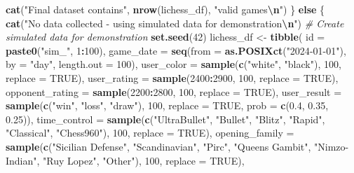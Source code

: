 \documentclass[
]{article}
\newenvironment{Shaded}{\begin{snugshade}}{\end{snugshade}}
\newcommand{\AttributeTok}[1]{\textcolor[rgb]{0.13,0.29,0.53}{#1}}
\newcommand{\CommentTok}[1]{\textcolor[rgb]{0.56,0.35,0.01}{\textit{#1}}}
\newcommand{\ConstantTok}[1]{\textcolor[rgb]{0.56,0.35,0.01}{#1}}
\newcommand{\ControlFlowTok}[1]{\textcolor[rgb]{0.13,0.29,0.53}{\textbf{#1}}}
\newcommand{\DecValTok}[1]{\textcolor[rgb]{0.00,0.00,0.81}{#1}}
\newcommand{\FloatTok}[1]{\textcolor[rgb]{0.00,0.00,0.81}{#1}}
\newcommand{\FunctionTok}[1]{\textcolor[rgb]{0.13,0.29,0.53}{\textbf{#1}}}
\newcommand{\NormalTok}[1]{#1}
\newcommand{\OtherTok}[1]{\textcolor[rgb]{0.56,0.35,0.01}{#1}}
\newcommand{\SpecialCharTok}[1]{\textcolor[rgb]{0.81,0.36,0.00}{\textbf{#1}}}
\newcommand{\StringTok}[1]{\textcolor[rgb]{0.31,0.60,0.02}{#1}}
\begin{document}
\begin{Shaded}
\begin{Highlighting}[]
  \FunctionTok{cat}\NormalTok{(}\StringTok{"Final dataset contains"}\NormalTok{, }\FunctionTok{nrow}\NormalTok{(lichess\_df), }\StringTok{"valid games}\SpecialCharTok{\textbackslash{}n}\StringTok{"}\NormalTok{)}
\NormalTok{\} }\ControlFlowTok{else}\NormalTok{ \{}
  \FunctionTok{cat}\NormalTok{(}\StringTok{"No data collected {-} using simulated data for demonstration}\SpecialCharTok{\textbackslash{}n}\StringTok{"}\NormalTok{)}
  \CommentTok{\# Create simulated data for demonstration}
  \FunctionTok{set.seed}\NormalTok{(}\DecValTok{42}\NormalTok{)}
\NormalTok{  lichess\_df }\OtherTok{\textless{}{-}} \FunctionTok{tibble}\NormalTok{(}
    \AttributeTok{id =} \FunctionTok{paste0}\NormalTok{(}\StringTok{"sim\_"}\NormalTok{, }\DecValTok{1}\SpecialCharTok{:}\DecValTok{100}\NormalTok{),}
    \AttributeTok{game\_date =} \FunctionTok{seq}\NormalTok{(}\AttributeTok{from =} \FunctionTok{as.POSIXct}\NormalTok{(}\StringTok{"2024{-}01{-}01"}\NormalTok{), }\AttributeTok{by =} \StringTok{"day"}\NormalTok{, }\AttributeTok{length.out =} \DecValTok{100}\NormalTok{),}
    \AttributeTok{user\_color =} \FunctionTok{sample}\NormalTok{(}\FunctionTok{c}\NormalTok{(}\StringTok{"white"}\NormalTok{, }\StringTok{"black"}\NormalTok{), }\DecValTok{100}\NormalTok{, }\AttributeTok{replace =} \ConstantTok{TRUE}\NormalTok{),}
    \AttributeTok{user\_rating =} \FunctionTok{sample}\NormalTok{(}\DecValTok{2400}\SpecialCharTok{:}\DecValTok{2900}\NormalTok{, }\DecValTok{100}\NormalTok{, }\AttributeTok{replace =} \ConstantTok{TRUE}\NormalTok{),}
    \AttributeTok{opponent\_rating =} \FunctionTok{sample}\NormalTok{(}\DecValTok{2200}\SpecialCharTok{:}\DecValTok{2800}\NormalTok{, }\DecValTok{100}\NormalTok{, }\AttributeTok{replace =} \ConstantTok{TRUE}\NormalTok{),}
    \AttributeTok{user\_result =} \FunctionTok{sample}\NormalTok{(}\FunctionTok{c}\NormalTok{(}\StringTok{"win"}\NormalTok{, }\StringTok{"loss"}\NormalTok{, }\StringTok{"draw"}\NormalTok{), }\DecValTok{100}\NormalTok{, }\AttributeTok{replace =} \ConstantTok{TRUE}\NormalTok{, }\AttributeTok{prob =} \FunctionTok{c}\NormalTok{(}\FloatTok{0.4}\NormalTok{, }\FloatTok{0.35}\NormalTok{, }\FloatTok{0.25}\NormalTok{)),}
    \AttributeTok{time\_control =} \FunctionTok{sample}\NormalTok{(}\FunctionTok{c}\NormalTok{(}\StringTok{"UltraBullet"}\NormalTok{, }\StringTok{"Bullet"}\NormalTok{, }\StringTok{"Blitz"}\NormalTok{, }\StringTok{"Rapid"}\NormalTok{, }\StringTok{"Classical"}\NormalTok{, }\StringTok{"Chess960"}\NormalTok{), }\DecValTok{100}\NormalTok{, }\AttributeTok{replace =} \ConstantTok{TRUE}\NormalTok{),}
    \AttributeTok{opening\_family =} \FunctionTok{sample}\NormalTok{(}\FunctionTok{c}\NormalTok{(}\StringTok{"Sicilian Defense"}\NormalTok{, }\StringTok{"Scandinavian"}\NormalTok{, }\StringTok{"Pirc"}\NormalTok{, }\StringTok{"Queen\textquotesingle{}s Gambit"}\NormalTok{, }\StringTok{"Nimzo{-}Indian"}\NormalTok{, }\StringTok{"Ruy Lopez"}\NormalTok{, }\StringTok{"Other"}\NormalTok{), }\DecValTok{100}\NormalTok{, }\AttributeTok{replace =} \ConstantTok{TRUE}\NormalTok{),}

\end{Highlighting}
\end{Shaded}
\end{document}
